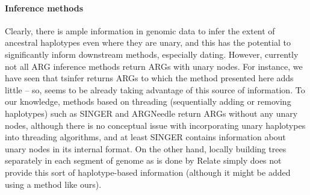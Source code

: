 \documentclass[10pt,twoside,lineno]{gsajnl}
\begin{document}
\paragraph{Inference methods}
Clearly, there is ample information in genomic data to infer the extent of ancestral haplotypes even where they are unary,
and this has the potential to significantly inform downstream methods, especially dating.
However, currently not all ARG inference methods return ARGs with unary nodes.
For instance, we have seen that tsinfer returns ARGs to which the method presented here adds little --
so, seems to be already taking advantage of this source of information.
To our knowledge, methods based on threading (sequentially adding or removing haplotypes) such as
SINGER \citep{deng2024robust} and ARGNeedle \citep{zhang2023biobankscale} return ARGs without any unary nodes,
although there is no conceptual issue with incorporating unary haplotypes into threading algorithms,
and at least SINGER contains information about unary nodes in its internal format.
On the other hand, locally building trees separately in each segment of genome as is done by Relate \cite{speidel2019method}
simply does not provide this sort of haplotype-based information (although it might be added using a method like ours).



\appendix
\renewcommand{\thefigure}{S\arabic{figure}}
\setcounter{figure}{0}
\end{document}
